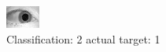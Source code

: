 \begin{figure}[h!]
\begin{center}
\includegraphics[width=0.60\columnwidth]{figures/ID1449_class_2_target_1.png}
\end{center}
\caption{ Classification: 2 actual target: 1}
\label{fig:ID1449_class_2_target_1}
\end{figure}
